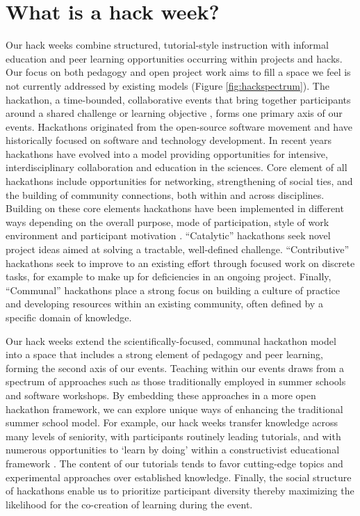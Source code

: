 \section*{What is a hack week?}

Our hack weeks combine structured, tutorial-style instruction with informal education and peer learning opportunities occurring within projects and hacks. 
Our focus on both pedagogy and open project work aims to fill a space we feel is not currently addressed by existing models (Figure \ref{fig:hackspectrum}). 
The hackathon, a time-bounded, collaborative events that bring together participants around a shared challenge or learning objective \cite{Decker2015}, forms one primary axis of our events. 
Hackathons originated from the open-source software movement and have historically focused on software and technology development. 
In recent years hackathons have evolved into a model providing opportunities for intensive, interdisciplinary collaboration \cite{Groen2015-cj} and education \cite{Kienzler2015-zu,Lamers2014-xf} in the sciences. 
Core element of all hackathons include opportunities for networking, strengthening of social ties, and the building of community connections, both within and across disciplines.
Building on these core elements hackathons have been implemented in different ways depending on the overall purpose, mode of participation, style of work environment and participant motivation \cite{Drouhard2017}. 
``Catalytic'' hackathons seek novel project ideas aimed at solving a tractable, well-defined challenge.
``Contributive'' hackathons seek to improve to an existing effort through focused work on discrete tasks, for example to make up for deficiencies in an ongoing project.
Finally, ``Communal'' hackathons place a strong focus on building a culture of practice and developing resources within an existing community, often defined by a specific domain of knowledge.

Our hack weeks extend the scientifically-focused, communal hackathon model into a space that includes a strong element of pedagogy and peer learning, forming the second axis of our events. 
Teaching within our events draws from a spectrum of approaches such as those traditionally employed in summer schools and software workshops. 
By embedding these approaches in a more open hackathon framework, we can explore unique ways of enhancing the traditional summer school model.
For example, our hack weeks transfer knowledge across many levels of seniority, with participants routinely leading tutorials, and with numerous opportunities to `learn by doing' within a constructivist educational framework \cite{Bransford2000-lu}.
The content of our tutorials tends to favor cutting-edge topics and experimental approaches over established knowledge. 
Finally, the social structure of hackathons enable us to prioritize participant diversity thereby maximizing the likelihood for the co-creation of learning during the event. 

